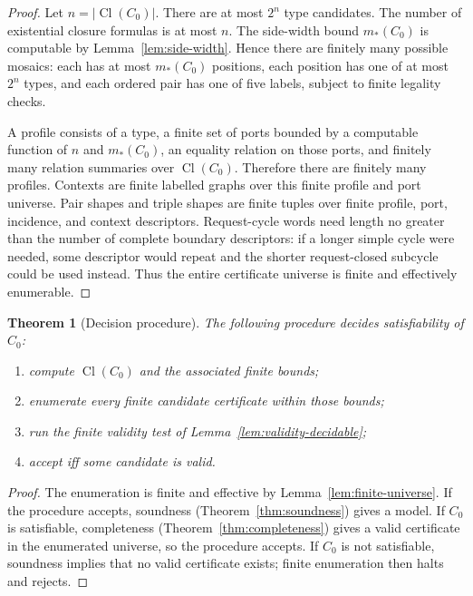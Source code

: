 \documentclass[11pt]{article}
\newtheorem{theorem}{Theorem}[section]
\newcommand{\Cl}{\operatorname{Cl}}
\begin{document}
\begin{proof}
Let $n=|\Cl(C_0)|$.  There are at most $2^n$ type candidates.  The number of existential closure formulas is at most $n$.  The side-width bound $m_*(C_0)$ is computable by Lemma~\ref{lem:side-width}.  Hence there are finitely many possible mosaics: each has at most $m_*(C_0)$ positions, each position has one of at most $2^n$ types, and each ordered pair has one of five labels, subject to finite legality checks.

A profile consists of a type, a finite set of ports bounded by a computable function of $n$ and $m_*(C_0)$, an equality relation on those ports, and finitely many relation summaries over $\Cl(C_0)$.  Therefore there are finitely many profiles.  Contexts are finite labelled graphs over this finite profile and port universe.  Pair shapes and triple shapes are finite tuples over finite profile, port, incidence, and context descriptors.  Request-cycle words need length no greater than the number of complete boundary descriptors: if a longer simple cycle were needed, some descriptor would repeat and the shorter request-closed subcycle could be used instead.  Thus the entire certificate universe is finite and effectively enumerable.
\end{proof}

\begin{theorem}[Decision procedure]\label{thm:decision}
The following procedure decides satisfiability of $C_0$:
\begin{enumerate}[label=(D\arabic*)]
\item compute $\Cl(C_0)$ and the associated finite bounds;
\item enumerate every finite candidate certificate within those bounds;
\item run the finite validity test of Lemma~\ref{lem:validity-decidable};
\item accept iff some candidate is valid.
\end{enumerate}
\end{theorem}

\begin{proof}
The enumeration is finite and effective by Lemma~\ref{lem:finite-universe}.  If the procedure accepts, soundness (Theorem~\ref{thm:soundness}) gives a model.  If $C_0$ is satisfiable, completeness (Theorem~\ref{thm:completeness}) gives a valid certificate in the enumerated universe, so the procedure accepts.  If $C_0$ is not satisfiable, soundness implies that no valid certificate exists; finite enumeration then halts and rejects.
\end{proof}
\end{document}
